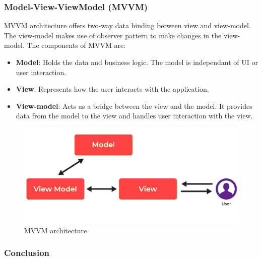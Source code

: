\subsubsection{Model-View-ViewModel (MVVM)}

MVVM architecture offers two-way data binding between view and view-model. The view-model makes use of observer pattern to make changes in the view-model. The components of MVVM are:

\begin{itemize}
    \item \textbf{Model}: Holds the data and business logic. The model is independant of UI or user interaction.
    \item \textbf{View}: Represents how the user interacts with the application.
    \item \textbf{View-model}: Acts as a bridge between the view and the model. It provides data from the model to the view and handles user interaction with the view.
\end{itemize}

\begin{figure}[H]
    \includegraphics[width=\textwidth]{assets/images/Research/System/MVVM.png}
    \caption{MVVM architecture}
    \label{fig:mvvm}
\end{figure}

\subsubsection{Conclusion}


